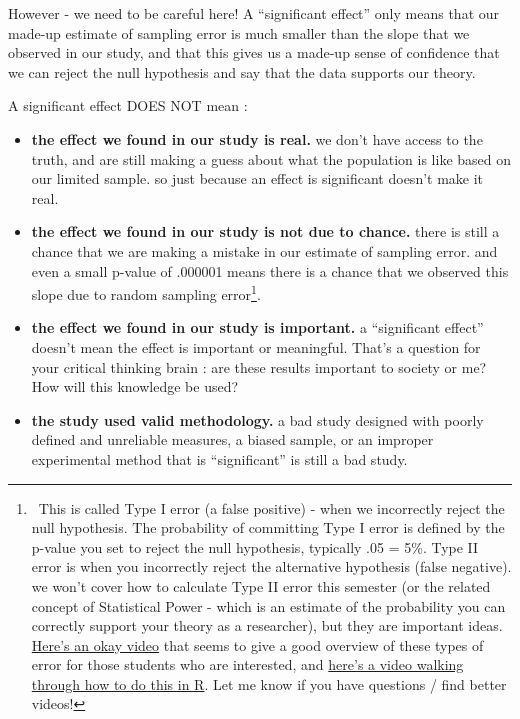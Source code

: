 \documentclass[
  letterpaper,
  DIV=11,
  numbers=noendperiod,
  oneside]{scrreprt}
\begin{document}
However - we need to be careful here! A ``significant effect'' only
means that our made-up estimate of sampling error is much smaller than
the slope that we observed in our study, and that this gives us a
made-up sense of confidence that we can reject the null hypothesis and
say that the data supports our theory.

A significant effect DOES NOT mean :~

\begin{itemize}
\item
  \textbf{the effect we found in our study is real.} we don't have
  access to the truth, and are still making a guess about what the
  population is like based on our limited sample. so just because an
  effect is significant doesn't make it real.
\item
  \textbf{the effect we found in our study is not due to chance.} there
  is still a chance that we are making a mistake in our estimate of
  sampling error. and even a small p-value of .000001 means there is a
  chance that we observed this slope due to random sampling
  error\footnote{~This is called Type I error (a false positive) - when
    we incorrectly reject the null hypothesis. The probability of
    committing Type I error is defined by the p-value you set to reject
    the null hypothesis, typically .05 = 5\%. Type II error is when you
    incorrectly reject the alternative hypothesis (false negative). we
    won't cover how to calculate Type II error this semester (or the
    related concept of Statistical Power - which is an estimate of the
    probability you can correctly support your theory as a researcher),
    but they are important ideas.
    \href{https://www.youtube.com/watch?v=OkbXBWuzikM}{Here's an okay
    video} that seems to give a good overview of these types of error
    for those students who are interested, and
    \href{https://www.youtube.com/watch?v=ZIjOG8LTTh8}{here's a video
    walking through how to do this in R}. Let me know if you have
    questions / find better videos!}.
\item
  \textbf{the effect we found in our study is important.} a
  ``significant effect'' doesn't mean the effect is important or
  meaningful. That's a question for your critical thinking brain : are
  these results important to society or me? How will this knowledge be
  used?
\item
  \textbf{the study used valid methodology.} a bad study designed with
  poorly defined and unreliable measures, a biased sample, or an
  improper experimental method that is ``significant'' is still a bad
  study.~
\end{itemize}
\end{document}
